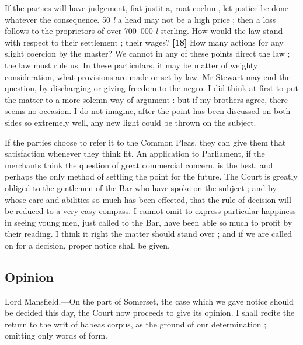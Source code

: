 \documentclass[a4paper]{article}
\begin{document}
If the parties will have judgement, fiat justitia, ruat coelum, let justice be done whatever the consequence. 50 \emph{l} a head may not be a high price ; then a loss follows to the proprietors of over 700~000 \emph{l} sterling. How would the law stand with respect to their settlement ; their wages? \textbf{[18]} How many actions for any slight coercion by the master? We cannot in any of these points direct the law ; the law must rule us. In these particulars, it may be matter of weighty consideration, what provisions are made or set by law. Mr Stewart may end the question, by discharging or giving freedom to the negro. I did think at first to put the matter to a more solemn way of argument : but if my brothers agree, there seems no occasion. I do not imagine, after the point has been discussed on both sides so extremely well, any new light could be thrown on the subject. 

If the parties choose to refer it to the Common Pleas, they can give them that satisfaction whenever they think fit. An application to Parliament, if the merchants think the question of great commercial concern, is the best, and perhaps the only method of settling the point for the future. The Court is greatly obliged to the gentlemen of the Bar who have spoke on the subject ; and by whose care and abilities so much has been effected, that the rule of decision will be reduced to a very easy compass. I cannot omit to express particular happiness in seeing young men, just called to the Bar, have been able so much to profit by their reading. I think it right the matter should stand over ; and if we are called on for a decision, proper notice shall be given.

\subsection{Opinion}
Lord Mansfield.---On the part of Somerset, the case which we gave notice should be decided this day, the Court now proceeds to give its opinion. I shall recite the return to the writ of habeas corpus, as the ground of our determination ; omitting only words of form. 
\end{document}
